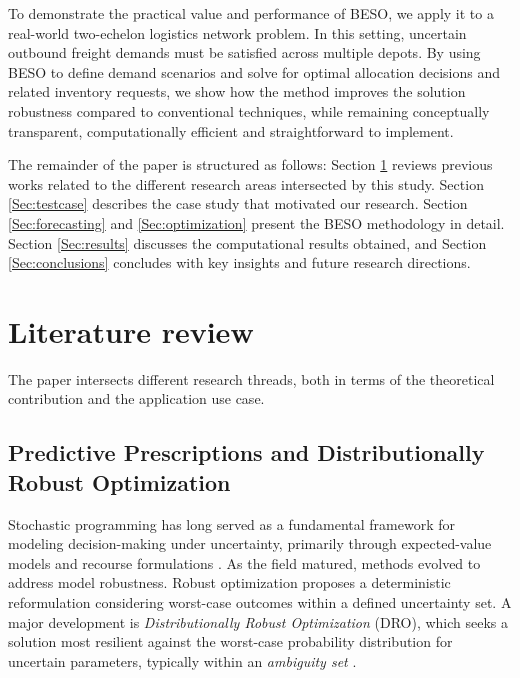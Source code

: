 \documentclass[a4paper,fleqn,3p,11pt,authoryear]{cas-sc}
\begin{document}
To demonstrate the practical value and performance of BESO, we apply it to a real-world two-echelon logistics network problem. In this setting, uncertain outbound freight demands must be satisfied across multiple depots. By using BESO to define demand scenarios and solve for optimal allocation decisions and related inventory requests, we show how the method improves the solution robustness compared to conventional techniques, while remaining conceptually transparent, computationally efficient and straightforward to implement.

The remainder of the paper is structured as follows: Section \ref{Sec:literature} reviews previous works related to the different research areas intersected by this study. Section \ref{Sec:testcase} describes the case study that motivated our research. Section \ref{Sec:forecasting} and \ref{Sec:optimization} present the BESO methodology in detail.  Section \ref{Sec:results} discusses the computational results obtained, and Section \ref{Sec:conclusions} concludes with key insights and future research directions.

\section{Literature review} \label{Sec:literature}

The paper intersects different research threads, both in terms of the theoretical contribution and the application use case.

\subsection{Predictive Prescriptions and Distributionally Robust Optimization}

Stochastic programming has long served as a fundamental framework for modeling decision-making under uncertainty, primarily through expected-value models and recourse formulations \citep{D55,B55}. As the field matured, methods evolved to address model robustness. Robust optimization \citep{BN98,BS04} proposes a deterministic reformulation considering worst-case outcomes within a defined uncertainty set. A major development is {\it Distributionally Robust Optimization} (DRO), which seeks a solution most resilient against the worst-case probability distribution for uncertain parameters, typically within an {\it ambiguity set} \citep{DY10}.
\end{document}
